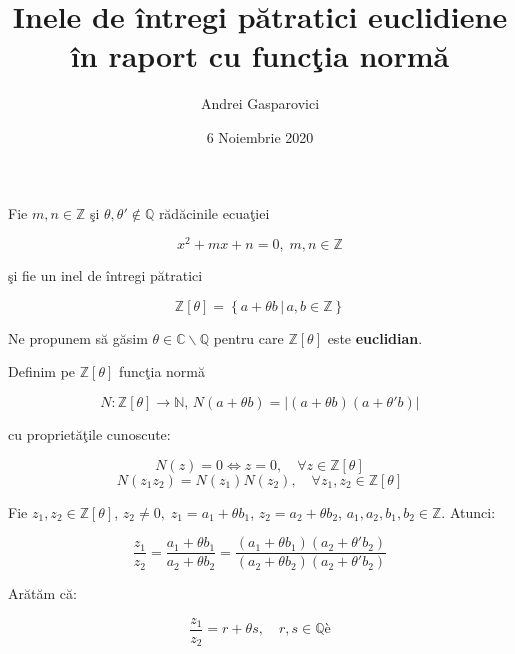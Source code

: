 \documentclass[12pt]{article}
\title{Inele de întregi pătratici euclidiene în raport cu funcţia normă}
\author{Andrei Gasparovici}
\date{6 Noiembrie 2020}
\begin{document}
\maketitle

Fie $m, n \in \mathbb{Z}$ şi $\theta, \theta' \notin \mathbb{Q}$ rădăcinile ecuaţiei

\begin{equation} \label{eq:def_theta}
    x^2 + mx + n = 0, \; m, n \in \mathbb{Z}
\end{equation}

şi fie un inel de întregi pătratici %

\begin{equation} \label{eq:def_z_theta}
    \mathbb{Z}[\theta] = \left\{ a + \theta b \,|\, a, b \in \mathbb{Z}\right\}
\end{equation}

\vspace{.8cm}
Ne propunem să găsim $\theta \in \mathbb{C} \backslash \mathbb{Q}$ pentru care $\mathbb{Z}[\theta]$ este \textbf{euclidian}.
\vspace{.8cm}

Definim pe $\mathbb{Z[\theta]}$ funcţia normă

\begin{equation} \label{eq:def_norm}
    N : \mathbb{Z[\theta]} \to \mathbb{N}, \, N(a + \theta b) = |(a + \theta b)(a + \theta' b)|
\end{equation}

cu proprietăţile cunoscute:

\begin{equation*}
N(z) = 0 \Leftrightarrow z = 0, \quad \forall z \in \mathbb{Z}[\theta]
\end{equation*}
\begin{equation*}
N(z_1 z_2) = N(z_1)N(z_2), \quad \forall z_1, z_2 \in \mathbb{Z}[\theta]
\end{equation*}

Fie $z_1, z_2 \in \mathbb{Z}[\theta]$, $z_2 \neq 0, \; z_1 = a_1 + \theta b_1$, $z_2 = a_2 + \theta b_2$,
$a_1,a_2,b_1,b_2 \in \mathbb{Z}$. Atunci:

\begin{equation} \label{eq:ratio}
    \frac{z_1}{z_2} = \frac{a_1 + \theta b_1}{a_2 + \theta b_2} = 
    \frac{(a_1 + \theta b_1)(a_2 + \theta' b_2)}{(a_2 + \theta b_2)(a_2 + \theta' b_2)}
\end{equation}

Arătăm că:

\begin{equation*}
    \frac{z_1}{z_2} = r + \theta s, \quad r, s \in \mathbb{Q}è
\end{equation*}
\end{document}
